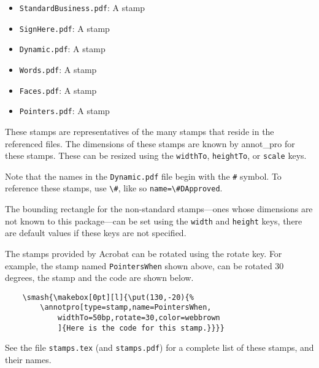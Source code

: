 \documentclass{article}
\begin{document}
\begin{itemize}
\item  \texttt{StandardBusiness.pdf}: A  stamp
\item  \texttt{SignHere.pdf}: A  stamp
\item  \texttt{Dynamic.pdf}: A  stamp
\item  \texttt{Words.pdf}: A  stamp
\item  \texttt{Faces.pdf}: A  stamp
\item  \texttt{Pointers.pdf}: A  stamp
\end{itemize}
These stamps are representatives of the many stamps that reside in the referenced files. The dimensions of these
stamps are known by \textsf{annot\_pro} for these stamps. These can be resized using the \texttt{widthTo}, \texttt{heightTo}, or \texttt{scale}
keys.

Note that the names in the \texttt{Dynamic.pdf} file begin with the \texttt{\#} symbol. To reference these stamps, use
\verb!\#!, like so \verb!name=\#DApproved!.

The bounding rectangle for the non-standard stamps---ones whose
dimensions are not known to this package---can be set using the
\texttt{width} and \texttt{height} keys, there are default values if
these keys are not specified.

The stamps provided by Acrobat can be rotated using the rotate key. For example, the stamp named
\texttt{PointersWhen} shown above, can be rotated 30 degrees, the stamp and the code are shown below.
\begin{verbatim}
    \smash{\makebox[0pt][l]{\put(130,-20){%
        \annotpro[type=stamp,name=PointersWhen,
            widthTo=50bp,rotate=30,color=webbrown
            ]{Here is the code for this stamp.}}}}
\end{verbatim}
See the file \texttt{stamps.tex} (and \texttt{stamps.pdf}) for a
complete list of these stamps, and their names.
\end{document}

